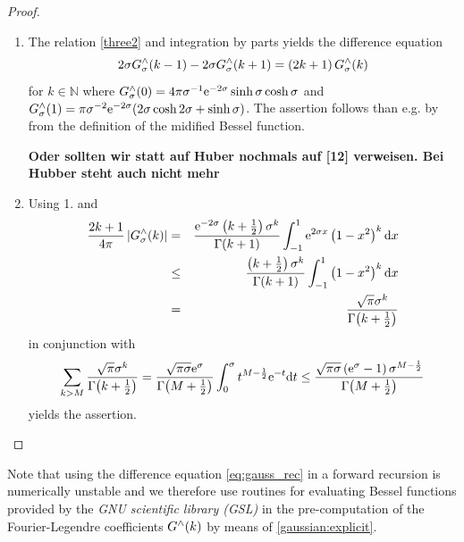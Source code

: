\documentclass[11pt,a4paper,twoside,bibtotoc]{scrartcl}
\theoremstyle{plain}
\theoremstyle{definition}
\theoremstyle{remark}
\newcommand{\N}{\ensuremath{\mathbb{N}}}
\newcommand{\fun}[2]{\ensuremath{#1{\hspace{-0.4ex}}\left(#2\right)}}
\newcommand{\dx}{\text{\rm{d}}}
\newcommand{\e}{\mbox{\rm{e}}}
\numberwithin{equation}{section}
\numberwithin{table}{section}
\numberwithin{figure}{section}
\begin{document}
\begin{proof}
  ${}^{}$\\[-2ex]
  \begin{enumerate}
  \item The relation \eqref{three2} and integration by parts yields the
    difference equation
    \begin{equation}\label{eq:gauss_rec}
    {2\sigma}\fun{G_{\sigma}^{\wedge}}{k-1} - {2\sigma}\fun{G_{\sigma}^{\wedge}}{k+1} = 
    \left(2k+1\right)\fun{G_{\sigma}^{\wedge}}{k}
    \end{equation}
    for $k\in \N$ where $\fun{G_{\sigma}^{\wedge}}{0} = 4 \pi \sigma^{-1}
    \e^{-2\sigma} \sinh \sigma \cosh \sigma$ and
    $\fun{G_{\sigma}^{\wedge}}{1} = \pi \sigma^{-2} \e^{-2\sigma} (2 \sigma
    \cosh 2 \sigma + \sinh \sigma )$.
    The assertion follows than e.g. by \cite{bahu01} from the
    definition of the midified Bessel function. 

{\bf Oder sollten wir statt auf Huber nochmals auf [12]
    verweisen. Bei Hubber steht auch nicht mehr}

  \item Using 1. and
  \begin{eqnarray*}
    \frac{2k+1}{4\pi} \left|\fun{G_{\sigma}^{\wedge}}{k}\right|
    &=&
    \frac{\e^{-2\sigma}
    \left(k+\frac{1}{2}\right)\sigma^k}{\fun{\Gamma}{k+1}} \int_{-1}^{1}
    \e^{2\sigma x} \left(1-x^2\right)^k \dx x\\
    &\le&
    \frac{\left(k+\frac{1}{2}\right)\sigma^k}{\fun{\Gamma}{k+1}}
    \int_{-1}^{1} \left(1-x^2\right)^k \dx x\\
    &=&
    \frac{\sqrt{\pi}\sigma^k}{\fun{\Gamma}{k+\frac{1}{2}}}
  \end{eqnarray*}
  in conjunction with
  \begin{equation*}
    \sum_{k>M} \frac{\sqrt{\pi}\sigma^k}{\fun{\Gamma}{k+\frac{1}{2}}}\\
    =
    \frac{\sqrt{\pi\sigma}\e^{\sigma}}{\fun{\Gamma}{M+\frac{1}{2}}} 
    \int_{0}^{\sigma} t^{M-\frac{1}{2}} \e^{-t} \dx t\\
    \le
    \frac{\sqrt{\pi\sigma}\left(\e^{\sigma}-1\right)
    \sigma^{M-\frac{1}{2}}}{\fun{\Gamma}{M+\frac{1}{2}}}
  \end{equation*}
  yields the assertion.
\end{enumerate}
\end{proof}

Note that using the difference equation \eqref{eq:gauss_rec} in a forward
recursion is numerically unstable and we therefore use routines for
evaluating Bessel functions provided by
the \emph{GNU scientific library (GSL)} \cite{gsl} in the
pre-computation of the Fourier-Legendre coefficients $\fun{G^{\wedge}}{k}$ 
by means of \eqref{gaussian:explicit}.
\end{document}

